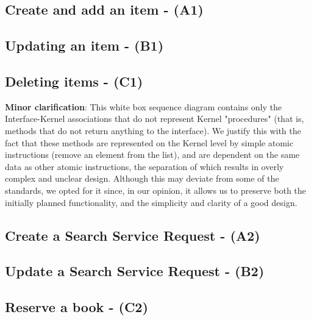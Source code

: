 \documentclass{article}
\begin{document}
\subsection{Create and add an item - (A1)}


% 

\subsection{Updating an item - (B1)}



\subsection{Deleting items - (C1)}



\textbf{Minor clarification}: This white box sequence diagram contains only the Interface-Kernel associations that do not represent Kernel "procedures" (that is, methods that do not return anything to the interface). We justify this with the fact that these methods are represented on the Kernel level by simple atomic instructions (remove an element from the list), and are dependent on the same data as other atomic instructions, the separation of which results in overly complex and unclear design. Although this may deviate from some of the standards, we opted for it since, in our opinion, it allows us to preserve both the initially planned functionality, and the simplicity and clarity of a good design. 


\subsection{Create a Search Service Request - (A2)}


\subsection{Update a Search Service Request - (B2)}


\subsection{Reserve a book - (C2)}


\end{document}
